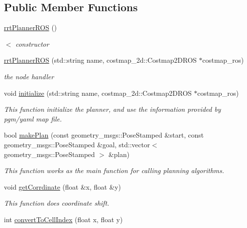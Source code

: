 \subsection*{Public Member Functions}
\begin{DoxyCompactItemize}
\item 
\hyperlink{classrrt__planner_1_1rrtPlannerROS_aa16e2cc2c0a27ef0a988d67d1d811bb5}{rrt\+Planner\+R\+OS} ()
\begin{DoxyCompactList}\small\item\em $<$ constructor \end{DoxyCompactList}\item 
\hyperlink{classrrt__planner_1_1rrtPlannerROS_af9bd26e4f73c143ff5016e30690476d2}{rrt\+Planner\+R\+OS} (std\+::string name, costmap\+\_\+2d\+::\+Costmap2\+D\+R\+OS $\ast$costmap\+\_\+ros)
\begin{DoxyCompactList}\small\item\em the node handler \end{DoxyCompactList}\item 
void \hyperlink{classrrt__planner_1_1rrtPlannerROS_ad58f8affe09327dc68321c37d1f123c3}{initialize} (std\+::string name, costmap\+\_\+2d\+::\+Costmap2\+D\+R\+OS $\ast$costmap\+\_\+ros)
\begin{DoxyCompactList}\small\item\em This function initialize the planner, and use the information provided by pgm/yaml map file. \end{DoxyCompactList}\item 
bool \hyperlink{classrrt__planner_1_1rrtPlannerROS_a753c96ea05471d2fc5710e883c6cbc3f}{make\+Plan} (const geometry\+\_\+msgs\+::\+Pose\+Stamped \&start, const geometry\+\_\+msgs\+::\+Pose\+Stamped \&goal, std\+::vector$<$ geometry\+\_\+msgs\+::\+Pose\+Stamped $>$ \&plan)
\begin{DoxyCompactList}\small\item\em This function works as the main function for calling planning algorithms. \end{DoxyCompactList}\item 
void \hyperlink{classrrt__planner_1_1rrtPlannerROS_a0765917723ac2e5cecdf526321bef3cb}{get\+Corrdinate} (float \&x, float \&y)
\begin{DoxyCompactList}\small\item\em This function does coordinate shift. \end{DoxyCompactList}\item 
int \hyperlink{classrrt__planner_1_1rrtPlannerROS_a92a01fb307538bf83e62c6f3b918fb99}{convert\+To\+Cell\+Index} (float x, float y)

\end{DoxyCompactItemize}
